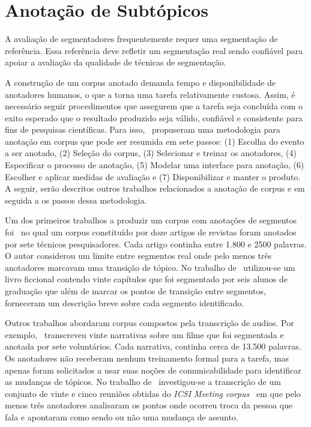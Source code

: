 \section{Anotação de Subtópicos}
\label{sec:anotacoes}
A avaliação de segmentadores frequentemente requer uma segmentação de referência. Essa referência deve refletir um segmentação real sendo confiável para apoiar a avaliação da qualidade de técnicas de segmentação. 

A construção de um corpus anotado demanda tempo e disponibilidade de anotadores humanos, o que a torna uma tarefa relativamente custosa. 
Assim, é necessário seguir procedimentos que assegurem que a tarefa seja concluída com o exito esperado que o resultado produzido seja válido, confiável e consistente para fins de pesquisas científicas. Para isso,~\cite{Hovy2010} propuseram uma metodologia para anotação em corpus que pode ser resumida em sete passos: 
(1) Escolha do evento a ser anotado, %
(2) Seleção do corpus,%
(3) Selecionar e treinar os anotadores,
(4) Especificar o processo de anotação,
(5) Modelar uma interface para anotação,
(6) Escolher e aplicar medidas de avaliação e 
(7) Disponibilizar e manter o produto.
% 
A seguir, serão descritos outros trabalhos relacionados a anotação de corpus e em seguida a os passos dessa metodologia. %

Um dos primeiros trabalhos a produzir um corpus com anotações de segmentos foi~\cite{Hearst1997} no qual um corpus constituído por doze artigos de revistas foram anotados por sete técnicos pesquisadores. Cada artigo continha entre 1.800 e 2500 palavras. O autor considerou um limite entre segmentos real onde pelo menos três anotadores marcavam uma transição de tópico. No trabalho de~\cite{Kazantseva2012} utilizou-se um livro ficcional contendo vinte capítulos que foi segmentado por seis alunos de graduação que além de marcar os pontos de transição entre segmentos, forneceram um descrição breve sobre cada segmento identificado. 

Outros trabalhos abordaram corpus compostos pela transcrição de audios. Por exemplo,~\cite{Passonneau1997} transcreveu vinte narrativas sobre um filme que foi segmentada e anotada por sete voluntários. Cada narrativa, continha cerca de 13.500 palavras. Os anotadores não receberam nenhum treinamento formal para a tarefa, mas apenas foram solicitados a usar suas noções de comunicabilidade para identificar as mudanças de tópicos. No trabalho de~\cite{Galley2003} investigou-se a transcrição de um conjunto de vinte e cinco reuniões obtidas do \textit{ICSI Meeting corpus}~\cite{Janin2003} em que pelo menos três anotadores analisaram os pontos onde ocorreu troca da pessoa que fala e apontaram como sendo ou não uma mudança de assunto.  

